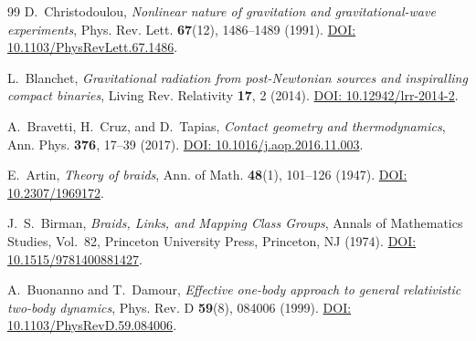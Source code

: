 \documentclass[11pt,a4paper,reqno]{article}
\theoremstyle{plain}
\theoremstyle{definition}
\theoremstyle{remark}
\numberwithin{equation}{section}
\begin{document}
\begin{thebibliography}{99}
D.~Christodoulou, \textit{Nonlinear nature of gravitation and gravitational-wave experiments}, Phys. Rev. Lett. \textbf{67}(12), 1486--1489 (1991). \href{https://doi.org/10.1103/PhysRevLett.67.1486}{DOI: 10.1103/PhysRevLett.67.1486}.

L.~Blanchet, \textit{Gravitational radiation from post-Newtonian sources and inspiralling compact binaries}, Living Rev. Relativity \textbf{17}, 2 (2014). \href{https://doi.org/10.12942/lrr-2014-2}{DOI: 10.12942/lrr-2014-2}.

A.~Bravetti, H.~Cruz, and D.~Tapias, \textit{Contact geometry and thermodynamics}, Ann. Phys. \textbf{376}, 17--39 (2017). \href{https://doi.org/10.1016/j.aop.2016.11.003}{DOI: 10.1016/j.aop.2016.11.003}.

E.~Artin, \textit{Theory of braids}, Ann. of Math. \textbf{48}(1), 101--126 (1947). \href{https://doi.org/10.2307/1969172}{DOI: 10.2307/1969172}.

J.~S.~Birman, \textit{Braids, Links, and Mapping Class Groups}, Annals of Mathematics Studies, Vol.~82, Princeton University Press, Princeton, NJ (1974). \href{https://doi.org/10.1515/9781400881427}{DOI: 10.1515/9781400881427}.

A.~Buonanno and T.~Damour, \textit{Effective one-body approach to general relativistic two-body dynamics}, Phys. Rev. D \textbf{59}(8), 084006 (1999). \href{https://doi.org/10.1103/PhysRevD.59.084006}{DOI: 10.1103/PhysRevD.59.084006}.

\end{thebibliography}
\end{document}
